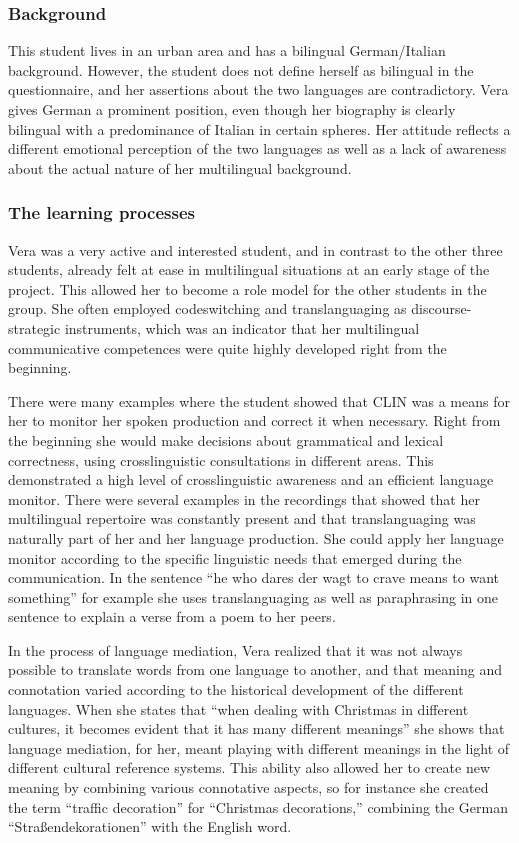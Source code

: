 \documentclass[output=paper]{../langscibook}
\begin{document}
\subsubsection{Background}
This student lives in an urban area and has a bilingual German/Italian background. However, the student does not define herself as bilingual in the questionnaire, and her assertions about the two languages are contradictory. Vera gives German a prominent position, even though her biography is clearly bilingual with a predominance of Italian in certain spheres. Her attitude reflects a different emotional perception of the two languages as well as a lack of awareness about the actual nature of her multilingual background.

\subsubsection{The learning processes}

Vera was a very active and interested student, and in contrast to the other three students, already felt at ease in multilingual situations at an early stage of the project. This allowed her to become a role model for the other students in the group. She often employed codeswitching and translanguaging as discourse-stra\-te\-gic instruments, which was an indicator that her multilingual communicative competences were quite highly developed right from the beginning. 

There were many examples where the student showed that CLIN was a means for her to monitor her spoken production and correct it when necessary. Right from the beginning she would make decisions about grammatical and lexical correctness, using crosslinguistic consultations in different areas. This demonstrated a high level of crosslinguistic awareness and an efficient language monitor. There were several examples in the recordings that showed that her multilingual repertoire was constantly present and that translanguaging was naturally part of her and her language production.  She could apply her language monitor according to the specific linguistic needs that emerged during the communication. In the sentence “he who dares der wagt to crave means to want something” for example she uses translanguaging as well as paraphrasing in one sentence to explain a verse from a poem to her peers. 

In the process of language mediation, Vera realized that it was not always possible to translate words from one language to another, and that meaning and connotation varied according to the historical development of the different languages. When she states that “when dealing with Christmas in different cultures, it becomes evident that it has many different meanings” she shows that language mediation, for her, meant playing with different meanings in the light of different cultural reference systems. This ability also allowed her to create new meaning by combining various connotative aspects, so for instance she created the term “traffic decoration” for “Christmas decorations,” combining the German “Straßendekorationen” with the English word. 
\end{document}

